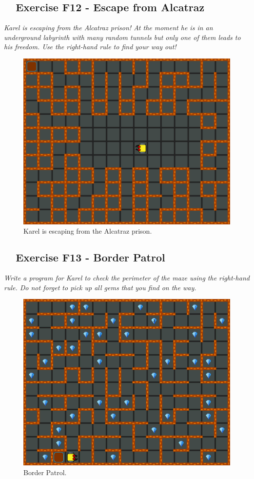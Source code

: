 {{{{\subsection{\ \ Exercise F12 - Escape from Alcatraz}

{\em Karel is escaping from the Alcatraz prison! At the moment he is in an underground labyrinth with many random tunnels but only one of them leads to his freedom. Use the right-hand rule to find your way out!}\\[-7mm]


\begin{figure}[!ht]
\begin{center}
\includegraphics[height=0.4\textwidth]{imgk/f12.png}
\end{center}
\vspace{-4mm}
\caption{Karel is escaping from the Alcatraz prison.}
\label{fig:f12}
\vspace{-10mm}
\end{figure}
\noindent
\newpage

\subsection{\ \ Exercise F13 - Border Patrol}

{\em Write a program for Karel to check the perimeter of the maze using the 
right-hand rule. Do not forget to pick up all gems that you find on the way.}\\[-7mm]

\begin{figure}[!ht]
\begin{center}
\includegraphics[height=0.4\textwidth]{imgk/f13.png}
\end{center}
\vspace{-4mm}
\caption{Border Patrol.}
\label{fig:f13}
\vspace{-12mm}
\end{figure}
\noindent

}}}}
